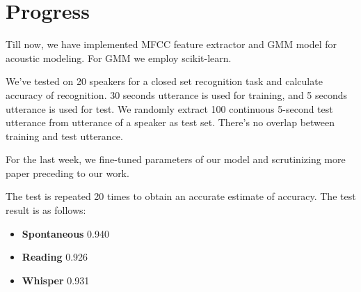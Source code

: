 
\section{Progress}
	Till now, we have implemented MFCC feature extractor and GMM model for
	acoustic modeling. For GMM we employ scikit-learn\cite{scikit-learn}.

	We've tested on 20 speakers for a closed set recognition task and calculate
	accuracy of recognition. 30 seconds utterance is used for training, and 5
	seconds utterance is used for test. We randomly extract 100 continuous 5-second
	test utterance from utterance of a speaker as test set.
	There's no overlap between training and test utterance.

	For the last week, we fine-tuned parameters of our model and scrutinizing more
	paper preceding to our work.

	The test is repeated 20 times to obtain an accurate estimate of accuracy.
	The test result is as follows:

	\begin{itemize}
		\item \textbf{Spontaneous} 0.940
		\item \textbf{Reading} 0.926
		\item \textbf{Whisper} 0.931
	\end{itemize}
